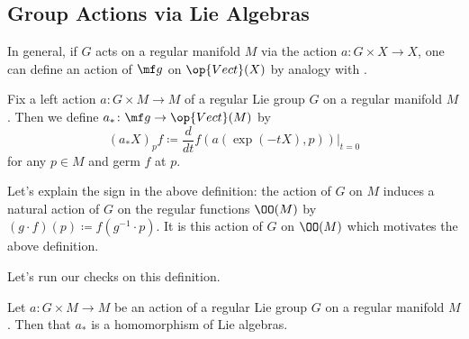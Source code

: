 \documentclass[../notes.tex]{subfiles}
\begin{document}
\subsection{Group Actions via Lie Algebras}
In general, if $G$ acts on a regular manifold $M$ via the action $a\colon G\times X\to X$, one can define an action of $\mf g$ on $\op{Vect}(X)$ by analogy with .
\begin{definition}
	Fix a left action $a\colon G\times M\to M$ of a regular Lie group $G$ on a regular manifold $M$. Then we define $a_*\colon\mf g\to\op{Vect}(M)$ by
	\[(a_*X)_pf\coloneqq\frac d{dt}f(a(\exp(-tX),p))\bigg|_{t=0}\]
	for any $p\in M$ and germ $f$ at $p$.
\end{definition}
\begin{remark}
	Let's explain the sign in the above definition: the action of $G$ on $M$ induces a natural action of $G$ on the regular functions $\OO(M)$ by $(g\cdot f)(p)\coloneqq f\left(g^{-1}\cdot p\right)$. It is this action of $G$ on $\OO(M)$ which motivates the above definition.
\end{remark}
Let's run our checks on this definition.
\begin{lemma}
	Let $a\colon G\times M\to M$ be an action of a regular Lie group $G$ on a regular manifold $M$. Then that $a_*$ is a homomorphism of Lie algebras.
\end{lemma}
\end{document}
